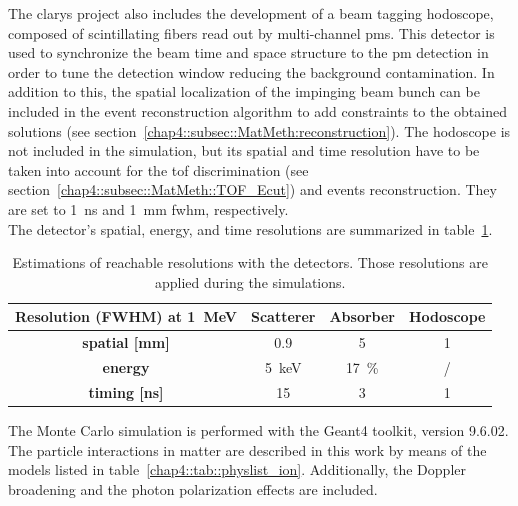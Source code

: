 The \gls{clarys} project also includes the development of a beam tagging hodoscope, composed of scintillating fibers read out by multi-channel \glspl{pm}. This detector is used to synchronize the beam time and space structure to the \gls{pm} detection in order to tune the detection window reducing the background contamination. In addition to this, the spatial localization of the impinging beam bunch can be included in the event reconstruction algorithm to add constraints to the obtained solutions (see section~\ref{chap4::subsec::MatMeth:reconstruction}). The hodoscope is not included in the simulation, but its spatial and time resolution have to be taken into account for the \gls{tof} discrimination (see section~\ref{chap4::subsec::MatMeth::TOF_Ecut}) and events reconstruction. They are set to 1~ns and 1~mm \gls{fwhm}, respectively.\\ 
The detector's spatial, energy, and time resolutions are summarized in table~\ref{chap4::tab::table_resolution_detectors_CC_simulation_Hadronth}.

\begin{table}[!htbp]

\centering
\caption{Estimations of reachable resolutions with the detectors. Those resolutions are applied during the simulations.}
\label{chap4::tab::table_resolution_detectors_CC_simulation_Hadronth}
\begin{tabular}{cccc}
\toprule
\rowcolor{myColorMainA!20} 
\textbf{Resolution (FWHM) at 1~MeV} & \textbf{Scatterer} & \textbf{Absorber} & \textbf{Hodoscope}\\
\midrule
\textbf{spatial [mm]	}			 &     0.9		 &  5 &	 1\\
\textbf{energy}				&	5~keV		&  17~\%	&	/\\
\textbf{timing [ns]}	        		&	15			&	3 	&  1\\
\bottomrule
\end{tabular}
\end{table}
    
The Monte Carlo simulation is performed with the Geant4 toolkit, version 9.6.02. 
The particle interactions in matter are described in this work by means of the models listed in table~\ref{chap4::tab::physlist_ion}. Additionally, the Doppler broadening and the photon polarization effects are included.
 
